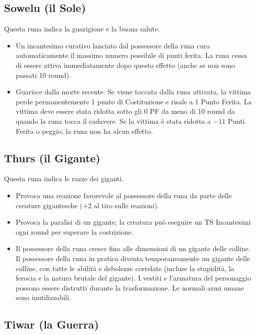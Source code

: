 \documentclass[10pt,a4paper]{article}
\begin{document}
 
\subsection*{Sowelu (il Sole)}
 
Questa runa indica la guarigione e la buona salute.
 \begin{itemize}
\item       Un incantesimo curativo lanciato dal possessore della runa cura automaticamente il massimo numero possibile di punti ferita. La runa cessa di essere attiva immediatamente dopo questo effetto (anche se non sono passati 10 round).
 
\item       Guarisce dalla morte recente. Se viene toccata dalla runa attivata, la vittima perde permanentemente 1 punto di Costituzione e risale a 1 Punto Ferita. La vittima deve essere stata ridotta sotto gli 0 PF da meno di 10 round da quando la runa tocca il cadavere. Se la vittima \`{e} stata ridotta a $-11$ Punti Ferita o peggio, la runa non ha alcun effetto.
 \end{itemize}
 
 
\subsection*{Thurs (il Gigante)}
 
Questa runa indica le razze dei giganti.
  \begin{itemize}
\item       Provoca una reazione favorevole al possessore della runa da parte delle creature gigantesche ($+2$ al tiro sulle reazioni).
 
\item       Provoca la paralisi di un gigante; la creatura pu\`{o} eseguire un TS Incantesimi ogni round per superare la costrizione.
 
\item        Il possessore della runa cresce fino alle dimensioni di un gigante delle colline. Il possessore della runa in pratica diventa temporaneamente un gigante delle colline, con tutte le abilit\`{a} e debolezze correlate (incluse la stupidit\`{a}, la ferocia e la natura brutale del gigante). I vestiti e l'armatura del personaggio possono essere distrutti durante la trasformazione. Le normali armi umane sono inutilizzabili.
 \end{itemize}
 
 
\subsection*{Tiwar (la Guerra)}
 
\end{document}
